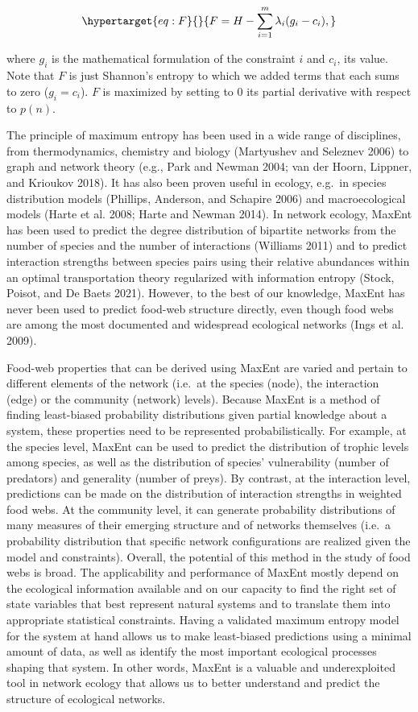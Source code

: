 \documentclass[10pt,oneside]{article}
\begin{document}
\begin{equation}\protect\hypertarget{eq:F}{}{F = H - \sum_{i=1}^m \lambda_i (g_i-c_i),}\label{eq:F}\end{equation}

where \(g_i\) is the mathematical formulation of the constraint \(i\)
and \(c_i\), its value. Note that \(F\) is just Shannon's entropy to
which we added terms that each sums to zero (\(g_i = c_i\)). \(F\) is
maximized by setting to \(0\) its partial derivative with respect to
\(p(n)\).

The principle of maximum entropy has been used in a wide range of
disciplines, from thermodynamics, chemistry and biology (Martyushev and
Seleznev 2006) to graph and network theory (e.g., Park and Newman 2004;
van der Hoorn, Lippner, and Krioukov 2018). It has also been proven
useful in ecology, e.g.~in species distribution models (Phillips,
Anderson, and Schapire 2006) and macroecological models (Harte et al.
2008; Harte and Newman 2014). In network ecology, MaxEnt has been used
to predict the degree distribution of bipartite networks from the number
of species and the number of interactions (Williams 2011) and to predict
interaction strengths between species pairs using their relative
abundances within an optimal transportation theory regularized with
information entropy (Stock, Poisot, and De Baets 2021). However, to the
best of our knowledge, MaxEnt has never been used to predict food-web
structure directly, even though food webs are among the most documented
and widespread ecological networks (Ings et al. 2009).

Food-web properties that can be derived using MaxEnt are varied and
pertain to different elements of the network (i.e.~at the species
(node), the interaction (edge) or the community (network) levels).
Because MaxEnt is a method of finding least-biased probability
distributions given partial knowledge about a system, these properties
need to be represented probabilistically. For example, at the species
level, MaxEnt can be used to predict the distribution of trophic levels
among species, as well as the distribution of species' vulnerability
(number of predators) and generality (number of preys). By contrast, at
the interaction level, predictions can be made on the distribution of
interaction strengths in weighted food webs. At the community level, it
can generate probability distributions of many measures of their
emerging structure and of networks themselves (i.e.~a probability
distribution that specific network configurations are realized given the
model and constraints). Overall, the potential of this method in the
study of food webs is broad. The applicability and performance of MaxEnt
mostly depend on the ecological information available and on our
capacity to find the right set of state variables that best represent
natural systems and to translate them into appropriate statistical
constraints. Having a validated maximum entropy model for the system at
hand allows us to make least-biased predictions using a minimal amount
of data, as well as identify the most important ecological processes
shaping that system. In other words, MaxEnt is a valuable and
underexploited tool in network ecology that allows us to better
understand and predict the structure of ecological networks.
\end{document}
